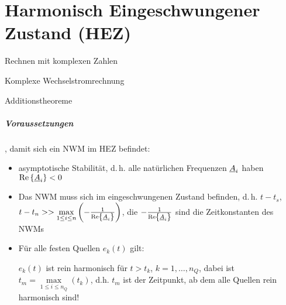 
\chapter{Harmonisch Eingeschwungener Zustand (HEZ)}

\begin{skills}
  \item Rechnen mit komplexen Zahlen
  \item Komplexe Wechselstromrechnung
  \item Additionstheoreme
\end{skills}


\paragraph{Voraussetzungen}, damit sich ein \acs{NWM} im \acs{HEZ} befindet:


\begin{itemize}
  \item asymptotische Stabilität, d.\,h. alle natürlichen Frequenzen $\underline{A}_i$
    haben $\operatorname{Re}\left\{\underline{A}_i\right\} < 0$
  \item Das \acs{NWM} muss sich im eingeschwungenen Zustand befinden, \mbox{d.\,h.}\xspace
    $t-t_s$, $t-t_n >> \underset{1\leq i\leq n}{\operatorname{max}}
    \left(-\frac{1}{\operatorname{Re}\left\{\underline{A}_i\right\}}\right)$, die $-\frac{1}{\operatorname{Re}\left\{\underline{A}_i\right\}}$
    sind die Zeitkonstanten des \acs{NWM}s
  \item Für alle festen Quellen $e_k(t)$ gilt:
  
    $e_k(t)$ ist rein harmonisch für $t>t_k$, $k=1,\ldots,n_Q$, dabei ist
    $t_m = \underset{1\leq i\leq n_Q}{\operatorname{max}}(t_k)$,
    d.h. $t_m$ ist der Zeitpunkt, ab dem alle Quellen rein harmonisch sind!
\end{itemize}


